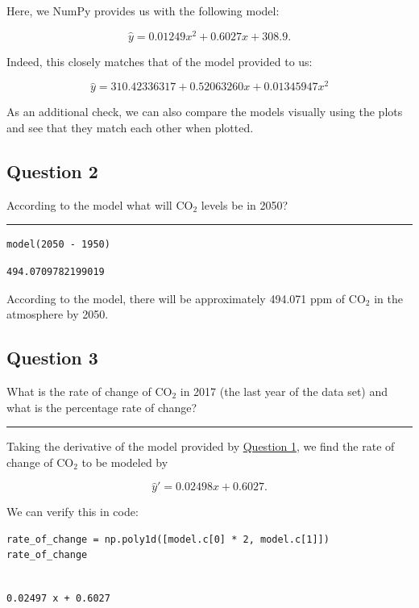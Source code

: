 \documentclass[11pt]{article}
\begin{document}
Here, we NumPy provides us with the following model:

\[\hat{y} = 0.01249x^2 + 0.6027x + 308.9.\]

Indeed, this closely matches that of the model provided
to us:

\[\hat{y} = 310.42336317 + 0.52063260x + 0.01345947x^2\]

As an additional check, we can also compare the models
visually using the plots and see that they match each
other when plotted.

\subsection{Question 2}
\label{sec:orgf700d27}

According to the model what will CO\(_{\text{2}}\) levels be in 2050?

\noindent\rule{\textwidth}{0.5pt}

\begin{verbatim}
model(2050 - 1950)
\end{verbatim}

\begin{verbatim}
494.0709782199019
\end{verbatim}

According to the model, there will be approximately
494.071 ppm of CO\(_{\text{2}}\) in the atmosphere by 2050.

\subsection{Question 3}
\label{sec:org0182eb6}

What is the rate of change of CO\(_{\text{2}}\) in 2017
(the last year of the data set) and what is
the percentage rate of change?

\noindent\rule{\textwidth}{0.5pt}

Taking the derivative of the model provided by \hyperref[sec:org98ee15e]{Question 1},
we find the rate of change of CO\(_{\text{2}}\) to be modeled by

\[\hat{y}' = 0.02498x + 0.6027.\]

We can verify this in code:

\begin{verbatim}
rate_of_change = np.poly1d([model.c[0] * 2, model.c[1]])
rate_of_change
\end{verbatim}

\begin{verbatim}
 
0.02497 x + 0.6027
\end{verbatim}
\end{document}
